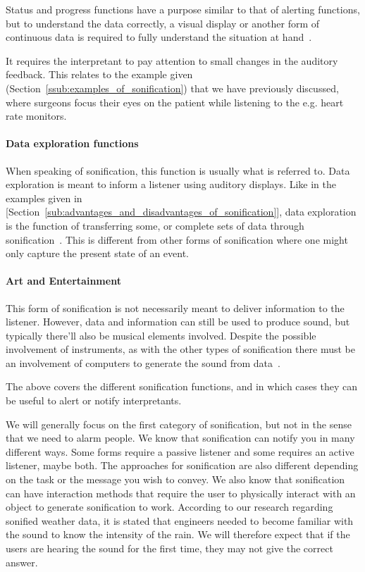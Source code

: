 Status and progress functions have a purpose similar to that of alerting functions, but to understand the data correctly, a visual display or another form of continuous data is required to fully understand the situation at hand~\cite*[pp.5]{walker2011}. 

It requires the interpretant to pay attention to small changes in the auditory feedback. This relates to the example given (Section~\ref{ssub:examples_of_sonification}) that we have previously discussed, where surgeons focus their eyes on the patient while listening to the e.g. heart rate monitors.




\paragraph{Data exploration functions} %
\label{par:data_exploration_functions}

When speaking of sonification, this function is usually what is referred to. Data exploration is meant to inform a listener using auditory displays. Like in the examples given in [Section~\ref{sub:advantages_and_disadvantages_of_sonification}], data exploration is the function of transferring some, or complete sets of data through sonification~\cite*[pp.5]{walker2011}. 
This is different from other forms of sonification where one might only capture the present state of an event.



\paragraph{Art and Entertainment} %
\label{par:art_and_entertainment}

This form of sonification is not necessarily meant to deliver information to the listener. However, data and information can still be used to produce sound, but typically there’ll also be musical elements involved. Despite the possible involvement of instruments, as with the other types of sonification there must be an involvement of computers to generate the sound from data~\cite*[pp.5]{walker2011}. 


The above covers the different sonification functions, and in which cases they can be useful to alert or notify interpretants.

We will generally focus on the first category of sonification, but not in the sense that we need to alarm people.
We know that sonification can notify you in many different ways. Some forms require a passive listener and some requires an active listener, maybe both. The approaches for sonification are also different depending on the task or the message you wish to convey. We also know that sonification can have interaction methods that require the user to physically interact with an object to generate sonification to work. According to our research regarding sonified weather data, it is stated that engineers needed to become familiar with the sound to know the intensity of the rain. We will therefore expect that if the users are hearing the sound for the first time, they may not give the correct answer.

